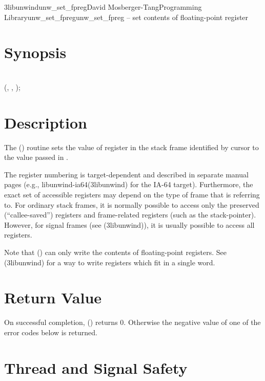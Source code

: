 \documentclass{article}
\begin{document}
\begin{Name}{3libunwind}{unw\_set\_fpreg}{David Mosberger-Tang}{Programming Library}{unw\_set\_fpreg}unw\_set\_fpreg -- set contents of floating-point register
\end{Name}

\section{Synopsis}

\\

 (,  ,  );\\

\section{Description}

The () routine sets the value of register
 in the stack frame identified by cursor  to the
value passed in .

The register numbering is target-dependent and described in separate
manual pages (e.g., libunwind-ia64(3libunwind) for the IA-64 target).
Furthermore, the exact set of accessible registers may depend on the
type of frame that  is referring to.  For ordinary stack
frames, it is normally possible to access only the preserved
(``callee-saved'') registers and frame-related registers (such as the
stack-pointer).  However, for signal frames (see
(3libunwind)), it is usually possible to access
all registers.

Note that () can only write the contents of
floating-point registers.  See (3libunwind) for a way to
write registers which fit in a single word.

\section{Return Value}

On successful completion, () returns 0.
Otherwise the negative value of one of the error codes below is
returned.

\section{Thread and Signal Safety}
\end{document}
